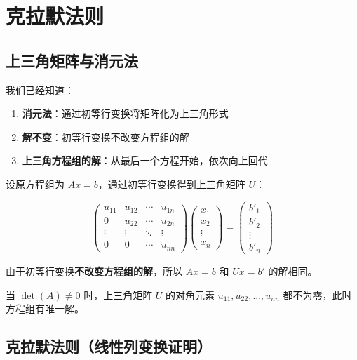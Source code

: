 \documentclass[12pt,a4paper]{article}
\begin{document}
\section{克拉默法则}

\subsection{上三角矩阵与消元法}

我们已经知道：
\begin{enumerate}
    \item \textbf{消元法}：通过初等行变换将矩阵化为上三角形式
    \item \textbf{解不变}：初等行变换不改变方程组的解
    \item \textbf{上三角方程组的解}：从最后一个方程开始，依次向上回代
\end{enumerate}

设原方程组为 $Ax = b$，通过初等行变换得到上三角矩阵 $U$：

\[
\begin{pmatrix}
u_{11} & u_{12} & \cdots & u_{1n} \\
0 & u_{22} & \cdots & u_{2n} \\
\vdots & \vdots & \ddots & \vdots \\
0 & 0 & \cdots & u_{nn}
\end{pmatrix}
\begin{pmatrix}
x_1 \\ x_2 \\ \vdots \\ x_n
\end{pmatrix}
=
\begin{pmatrix}
b'_1 \\ b'_2 \\ \vdots \\ b'_n
\end{pmatrix}
\]

由于初等行变换\textbf{不改变方程组的解}，所以 $Ax=b$ 和 $Ux=b'$ 的解相同。

当 $\det(A) \neq 0$ 时，上三角矩阵 $U$ 的对角元素 $u_{11}, u_{22}, ..., u_{nn}$ 都不为零，此时方程组有唯一解。

\subsection{克拉默法则（线性列变换证明）}

\begin{center}
\end{center}
\end{document}
